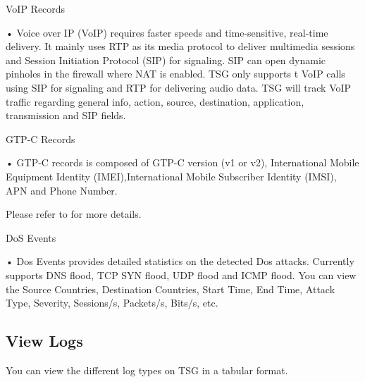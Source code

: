VoIP Records 


• Voice over IP (VoIP) requires faster speeds and time-sensitive, real-time delivery. It mainly uses RTP as its media protocol to 
deliver multimedia sessions and Session Initiation Protocol (SIP) for signaling. SIP can open dynamic pinholes in the firewall where NAT is enabled. 
TSG only supports t VoIP calls using SIP for signaling and RTP for delivering audio data. 
TSG will track VoIP traffic regarding general info, action, source, destination, application, transmission and SIP fields. 


GTP-C Records 


• GTP-C records is composed of GTP-C version (v1 or v2), International Mobile Equipment Identity (IMEI),International Mobile Subscriber Identity (IMSI), APN and Phone Number. 


Please refer to \hyperlink{link:Appendix B Log Fields Description}{\color{linkblue}{Appendix B Logs Fields Description}} for more details.


DoS Events


• Dos Events provides detailed statistics on the detected Dos attacks. Currently supports DNS flood, TCP SYN flood, UDP flood and ICMP flood. 
You can view the Source Countries, Destination Countries, Start Time, End Time, Attack Type, Severity, Sessions/s, Packets/s, Bits/s, etc.

\subsection*{\hypertarget{link:View Logs}{View Logs}}
\label{sec:monitor:log:view}

You can view the different log types on TSG in a tabular format.


